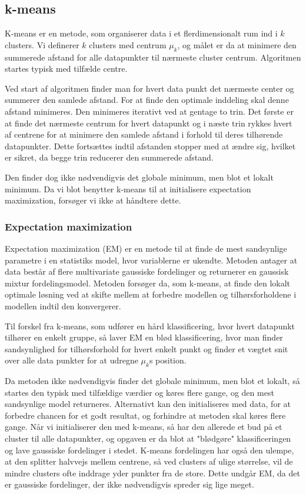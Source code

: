 

\subsection{k-means}

K-means er en metode, som organiserer data i et flerdimensionalt rum ind i $k$
clusters. Vi definerer $k$ clusters med centrum $\mu_k$, og målet er da at
minimere den summerede afstand for alle datapunkter til nærmeste cluster
centrum. Algoritmen startes typisk med tilfælde centre.

Ved start af algoritmen finder man for hvert data punkt det nærmeste center
og summerer den samlede afstand. For at finde den optimale inddeling skal
denne afstand minimeres. Den minimeres iterativt ved at gentage to trin. Det
første er at finde det nærmeste centrum for hvert datapunkt og i næste trin
rykkes hvert af centrene for at minimere den samlede afstand i forhold til
deres tilhørende datapunkter. Dette fortsættes indtil afstanden stopper med
at ændre sig, hvilket er sikret, da begge trin reducerer den summerede
afstand. 

Den finder dog ikke nødvendigvis det globale minimum, men blot et
lokalt minimum. Da vi blot benytter k-means til at initialisere expectation
maximization, forsøger vi ikke at håndtere dette.

\subsubsection{Expectation maximization}

Expectation maximization (EM) er en metode til at finde de mest sandsynlige
parametre i en statistiks model, hvor variablerne er ukendte. Metoden antager
at data består af flere multivariate gaussiske fordelinger og returnerer en
gaussisk mixtur fordelingsmodel. Metoden forsøger
da, som k-means, at finde den lokalt optimale løsning ved at skifte mellem at
forbedre modellen og tilhørsforholdene i modellen indtil den konvergerer.

Til forskel fra k-means, som udfører en hård klassificering, hvor hvert
datapunkt tilhører en enkelt gruppe, så laver EM en blød klassificering, hvor
man finder sandsynlighed for tilhørsforhold for hvert enkelt punkt og finder et
vægtet snit over alle data punkter for at udregne $\mu_k$s position.

Da metoden ikke nødvendigvis finder det globale minimum, men blot et lokalt,
så startes den typisk med tilfældige værdier og køres flere gange, og
den mest sandsynlige model returneres. Alternativt kan den initialiseres med
data, for at forbedre chancen for et godt resultat, og forhindre at metoden
skal køres flere gange. Når vi initialiserer den med k-means, så har den
allerede et bud på et cluster til alle datapunkter, og opgaven er da blot
at "blødgøre" klassificeringen og lave gaussiske fordelinger i stedet. K-means
fordelingen har også den ulempe, at den splitter halvvejs mellem centrene, så
ved clusters af ulige størrelse, vil de mindre clusters ofte inddrage yder
punkter fra de store. Dette undgår EM, da det er gaussiske fordelinger, der
ikke nødvendigvis spreder sig lige meget.


